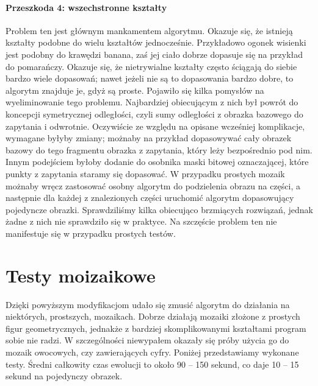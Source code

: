 \documentclass[a4paper,12pt,leqno]{article}
\begin{document}
\paragraph{Przeszkoda 4: wszechstronne kształty}
Problem ten jest głównym mankamentem algorytmu. Okazuje się, że istnieją kształty podobne do wielu kształtów jednocześnie. Przykładowo ogonek wisienki jest podobny do
krawędzi banana, zaś jej ciało dobrze dopasuje się na przykład do pomarańczy. Okazuje się, że nietrywialne kształty często ściągają do siebie bardzo wiele dopasowań;
nawet jeżeli nie są to dopasowania bardzo dobre, to algorytm znajduje je, gdyż są proste.
Pojawiło się kilka pomysłów na wyeliminowanie tego problemu. Najbardziej obiecującym z nich był powrót do koncepcji symetrycznej odległości, czyli sumy odległości z obrazka bazowego
do zapytania i odwrotnie. Oczywiście ze względu na opisane wcześniej komplikacje, wymagane byłyby zmiany; możnaby na przykład dopasowywać cały obrazek bazowy do tego fragmentu obrazka
z zapytania, który leży bezpośrednio pod nim. Innym podejściem byłoby dodanie do osobnika maski bitowej oznaczającej, które punkty z zapytania staramy się dopasować. W przypadku prostych
mozaik możnaby wręcz zastosować osobny algorytm do podzielenia obrazu na części, a następnie dla każdej z znalezionych części uruchomić algorytm dopasowujący pojedyncze obrazki.
Sprawdziliśmy kilka obiecująco brzmiących rozwiązań, jednak żadne z nich nie sprawdziło się w praktyce. Na szczęście problem ten nie manifestuje się w przypadku prostych testów.

\section{Testy moizaikowe}

Dzięki powyższym modyfikacjom udało się zmusić algorytm do działania na niektórych, prostszych, mozaikach. Dobrze działają mozaiki złożone z prostych figur geometrycznych,
jednakże z bardziej skomplikowanymi kształtami program sobie nie radzi. W szczególności niewypałem okazały się próby użycia go do mozaik owocowych, czy zawierających cyfry.
Poniżej przedstawiamy wykonane testy. Średni całkowity czas ewolucji to około 90 -- 150 sekund, co daje 10 -- 15 sekund na pojedynczy obrazek.
\end{document}
